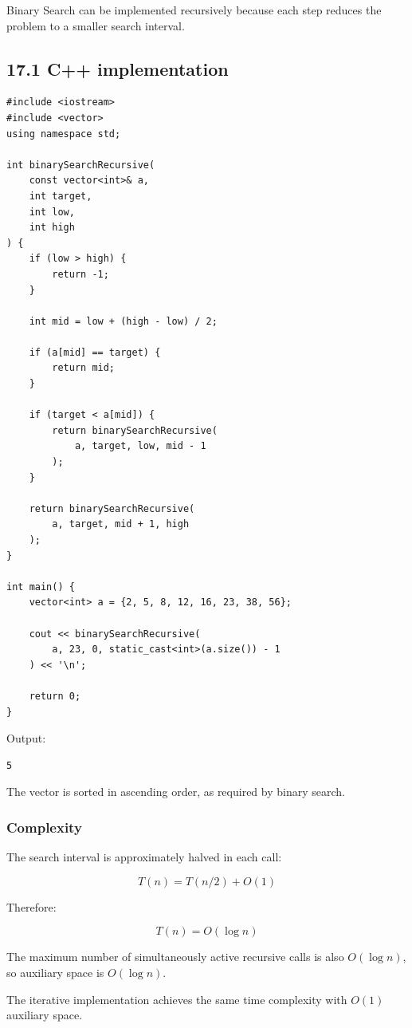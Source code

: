 Binary Search can be implemented recursively because each step reduces the problem to a smaller search interval.

\subsection{17.1 C++ implementation}

\begin{lstlisting}[style=cppstyle]
#include <iostream>
#include <vector>
using namespace std;

int binarySearchRecursive(
    const vector<int>& a,
    int target,
    int low,
    int high
) {
    if (low > high) {
        return -1;
    }

    int mid = low + (high - low) / 2;

    if (a[mid] == target) {
        return mid;
    }

    if (target < a[mid]) {
        return binarySearchRecursive(
            a, target, low, mid - 1
        );
    }

    return binarySearchRecursive(
        a, target, mid + 1, high
    );
}

int main() {
    vector<int> a = {2, 5, 8, 12, 16, 23, 38, 56};

    cout << binarySearchRecursive(
        a, 23, 0, static_cast<int>(a.size()) - 1
    ) << '\n';

    return 0;
}
\end{lstlisting}

Output:

\begin{lstlisting}[style=pseudocode]
5
\end{lstlisting}

The vector is sorted in ascending order, as required by binary search.

\subsubsection{Complexity}

The search interval is approximately halved in each call:


\[
T(n)=T(n/2)+O(1)
\]


Therefore:


\[
\boxed{T(n)=O(\log n)}
\]


The maximum number of simultaneously active recursive calls is also $O(\log n)$, so auxiliary space is $O(\log n)$.

The iterative implementation achieves the same time complexity with $O(1)$ auxiliary space.

